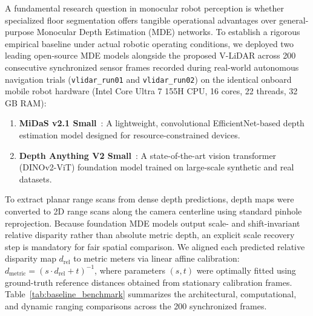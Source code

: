 \documentclass{ieeeaccess}
\begin{document}
A fundamental research question in monocular robot perception is whether specialized floor segmentation offers tangible operational advantages over general-purpose Monocular Depth Estimation (MDE) networks. To establish a rigorous empirical baseline under actual robotic operating conditions, we deployed two leading open-source MDE models alongside the proposed V-LiDAR across 200 consecutive synchronized sensor frames recorded during real-world autonomous navigation trials (\texttt{vlidar\_run01} and \texttt{vlidar\_run02}) on the identical onboard mobile robot hardware (Intel Core Ultra 7 155H CPU, 16 cores, 22 threads, 32\,GB RAM):
\begin{enumerate}
  \item \textbf{MiDaS v2.1 Small}~\cite{ranftl_2020_towards}: A lightweight, convolutional EfficientNet-based depth estimation model designed for resource-constrained devices.
  \item \textbf{Depth Anything V2 Small}~\cite{yang_2024_depth}: A state-of-the-art vision transformer (DINOv2-ViT) foundation model trained on large-scale synthetic and real datasets.
\end{enumerate}

To extract planar range scans from dense depth predictions, depth maps were converted to 2D range scans along the camera centerline using standard pinhole reprojection. Because foundation MDE models output scale- and shift-invariant relative disparity rather than absolute metric depth, an explicit scale recovery step is mandatory for fair spatial comparison. We aligned each predicted relative disparity map $d_{\mathrm{rel}}$ to metric meters via linear affine calibration: $d_{\mathrm{metric}} = (s \cdot d_{\mathrm{rel}} + t)^{-1}$, where parameters $(s, t)$ were optimally fitted using ground-truth reference distances obtained from stationary calibration frames. Table~\ref{tab:baseline_benchmark} summarizes the architectural, computational, and dynamic ranging comparisons across the 200 synchronized frames.
\end{document}
